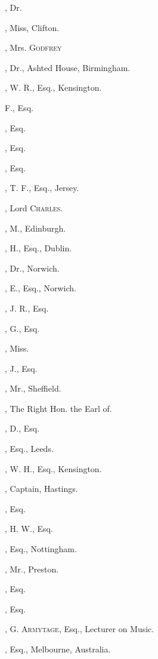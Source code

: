 \begin{multicols}{2}
, Dr.

, Miss, Clifton.

, Mrs. \textsc{Godfrey}

, Dr., Ashted House, Birmingham.

, W. R., Esq., Kensington.
\columnbreak

 F., Esq.

, Esq.

, Esq.

, Esq.

, T. F., Esq., Jersey.

, Lord \textsc{Charles}.

, M., Edinburgh.

, H., Esq., Dublin.

, Dr., Norwich.

, E., Esq., Norwich.

, J. R., Esq.

, G., Esq.

, Miss.

, J., Esq.

, Mr., Sheffield.
\bigskip

, The Right Hon. the Earl of.

, D., Esq.

, Esq., Leeds.

, W. H., Esq., Kensington.

, Captain, Hastings.

, Esq.

, H. W., Esq.

, Esq., Nottingham.

, Mr., Preston.

, Esq.

, Esq.

, G. \textsc{Armytage}, Esq., Lecturer on
Music.

, Esq., Melbourne, Australia.


\end{multicols}
